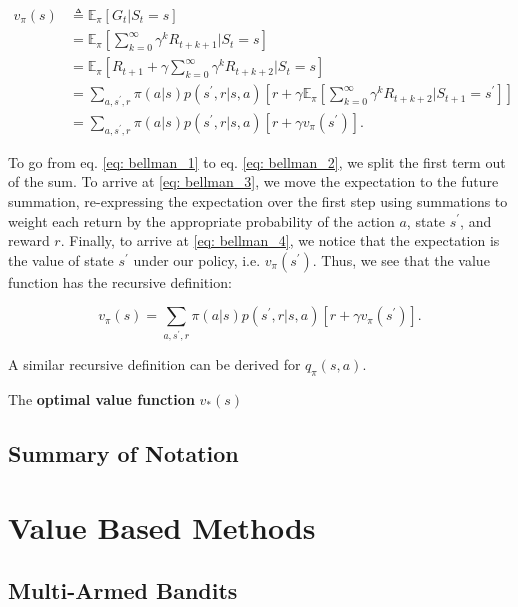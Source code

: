 \begin{align}
	\label{eq: bellman_0}
	v_\pi (s) &\triangleq \mathbb{E}_\pi \left[ G_t | S_t = s \right] \\
	\label{eq: bellman_1}
	&= \mathbb{E}_\pi \left[ \sum_{k=0}^{\infty} \gamma^k R_{t + k + 1} \bigg\vert S_t = s \right] \\
	\label{eq: bellman_2}
	&= \mathbb{E}_\pi \left[ R_{t+1} + \gamma \sum_{k=0}^{\infty} \gamma^k R_{t + k + 2} \bigg\vert S_t = s \right] \\
	\label{eq: bellman_3}
	&= \sum_{a, s^\prime, r} \pi(a | s) p(s^\prime, r | s, a) \left[ r + \gamma \mathbb{E}_\pi \left[ \sum_{k=0}^{\infty} \gamma^k R_{t + k + 2} \bigg\vert S_{t+1} = s^\prime \right] \right] \\
	\label{eq: bellman_4}
	&= \sum_{a, s^\prime, r} \pi(a | s) p(s^\prime, r | s, a) \left[ r + \gamma v_\pi (s^\prime) \right].
\end{align}

\noindent To go from eq. \ref{eq: bellman_1} to eq. \ref{eq: bellman_2}, we split the first term out of the sum. To arrive at \ref{eq: bellman_3}, we move the expectation to the future summation, re-expressing the expectation over the first step using summations to weight each return by the appropriate probability of the action $a$, state $s^\prime$, and reward $r$. Finally, to arrive at  \ref{eq: bellman_4}, we notice that the expectation is the value of state $s^\prime$ under our policy, i.e. $v_\pi (s^\prime)$. Thus, we see that the value function has the recursive definition:

\begin{equation}
	v_\pi (s) = \sum_{a, s^\prime, r} \pi(a | s) p(s^\prime, r | s, a) \left[ r + \gamma v_\pi (s^\prime) \right].
\end{equation}

\noindent A similar recursive definition can be derived for $q_\pi (s, a)$.

The \textbf{optimal value function} $v_* (s)$

\subsection{Summary of Notation}


\section{Value Based Methods}

\subsection{Multi-Armed Bandits}

